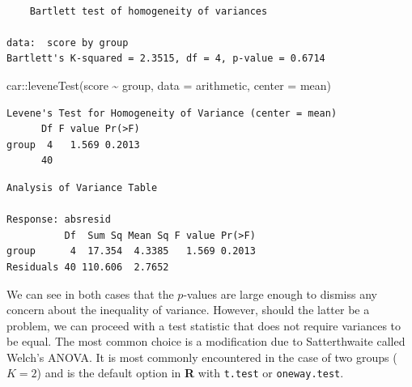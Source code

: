 \documentclass[
  11pt,
  letterpaper,
]{scrbook}
\newenvironment{Shaded}{\begin{snugshade}}{\end{snugshade}}
\newcommand{\AttributeTok}[1]{\textcolor[rgb]{0.40,0.45,0.13}{#1}}
\newcommand{\CommentTok}[1]{\textcolor[rgb]{0.37,0.37,0.37}{#1}}
\newcommand{\FunctionTok}[1]{\textcolor[rgb]{0.28,0.35,0.67}{#1}}
\newcommand{\NormalTok}[1]{\textcolor[rgb]{0.00,0.23,0.31}{#1}}
\newcommand{\OtherTok}[1]{\textcolor[rgb]{0.00,0.23,0.31}{#1}}
\newcommand{\SpecialCharTok}[1]{\textcolor[rgb]{0.37,0.37,0.37}{#1}}
\theoremstyle{definition}
\theoremstyle{definition}
\theoremstyle{remark}
\begin{document}
\begin{verbatim}

    Bartlett test of homogeneity of variances

data:  score by group
Bartlett's K-squared = 2.3515, df = 4, p-value = 0.6714
\end{verbatim}

\begin{Shaded}
\begin{Highlighting}[]
\NormalTok{car}\SpecialCharTok{::}\FunctionTok{leveneTest}\NormalTok{(score }\SpecialCharTok{\textasciitilde{}}\NormalTok{ group,}
                \AttributeTok{data =}\NormalTok{ arithmetic,}
                \AttributeTok{center =}\NormalTok{ mean)}
\end{Highlighting}
\end{Shaded}

\begin{verbatim}
Levene's Test for Homogeneity of Variance (center = mean)
      Df F value Pr(>F)
group  4   1.569 0.2013
      40               
\end{verbatim}

\begin{Shaded}
\end{Shaded}

\begin{verbatim}
Analysis of Variance Table

Response: absresid
          Df  Sum Sq Mean Sq F value Pr(>F)
group      4  17.354  4.3385   1.569 0.2013
Residuals 40 110.606  2.7652               
\end{verbatim}

We can see in both cases that the \(p\)-values are large enough to
dismiss any concern about the inequality of variance. However, should
the latter be a problem, we can proceed with a test statistic that does
not require variances to be equal. The most common choice is a
modification due to Satterthwaite called Welch's ANOVA. It is most
commonly encountered in the case of two groups (\(K=2\)) and is the
default option in \textbf{R} with \texttt{t.test} or
\texttt{oneway.test}.
\end{document}
